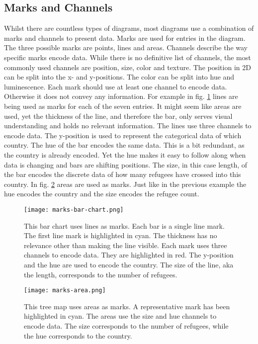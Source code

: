 \subsection{Marks and Channels}\label{sec:marks}
Whilst there are countless types of diagrams, most diagrams use a combination of marks and channels to present data. Marks are used for entries in the diagram. The three possible marks are points, lines and areas. Channels describe the way specific marks encode data. While there is no definitive list of channels, the most commonly used channels are position, size, color and texture. The position in 2D can be split into the x- and y-positions. The color can be split into hue and luminescence. Each mark should use at least one channel to encode data. Otherwise it does not convey any information. For example in fig. \ref{fig:bar-chart} lines are being used as marks for each of the seven entries. It might seem like areas are used, yet the thickness of the line, and therefore the bar, only serves visual understanding and holds no relevant information. The lines use three channels to encode data. The y-position is used to represent the categorical data of which country. The hue of the bar encodes the same data. This is a bit redundant, as the country is already encoded. Yet the hue makes it easy to follow along when data is changing and bars are shifting positions. The size, in this case length, of the bar encodes the discrete data of how many refugees have crossed into this country. In fig. \ref{fig:marks-area} areas are used as marks. Just like in the previous example the hue encodes the country and the size encodes the refugee count. 

\begin{figure}[ht!]
    \texttt{[image: marks-bar-chart.png]}
    \captionsetup{width=0.9\textwidth}
    \caption[bar-chart]{This bar chart uses lines as marks. Each bar is a single line mark. The first line mark is highlighted in cyan. The thickness has no relevance other than making the line visible. Each mark uses three channels to encode data. They are highlighted in red. The y-position and the hue are used to encode the country. The size of the line, aka the length, corresponds to the number of refugees.}
    \label{fig:bar-chart}
\end{figure}

\begin{figure}[ht!]
    \texttt{[image: marks-area.png]}
    \captionsetup{width=0.9\textwidth}
    \caption[marks-area]{This tree map uses areas as marks. A representative mark has been highlighted in cyan. The areas use the size and hue channels to encode data. The size corresponds to the number of refugees, while the hue corresponds to the country.}
    \label{fig:marks-area}
\end{figure}

